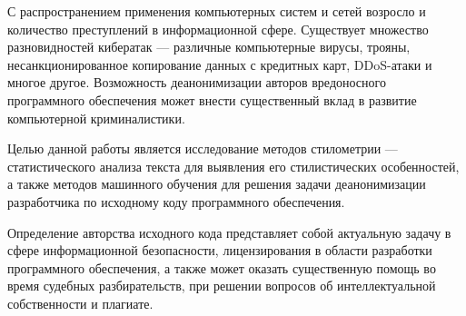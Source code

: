 С распространением применения компьютерных систем и сетей возросло и количество преступлений в 
информационной сфере. Существует множество разновидностей кибератак --- различные компьютерные вирусы, 
трояны, несанкционированное копирование данных с кредитных карт, DDoS-атаки и многое другое. 
Возможность деанонимизации авторов вредоносного программного обеспечения может внести существенный вклад 
в развитие компьютерной криминалистики.

Целью данной работы является исследование методов стилометрии --- статистического анализа текста 
для выявления его стилистических особенностей, а также методов машинного обучения для решения задачи 
деанонимизации разработчика по исходному коду программного обеспечения.

Определение авторства исходного кода представляет собой актуальную задачу в сфере информационной 
безопасности, лицензирования в области разработки программного обеспечения, а также может оказать 
существенную помощь во время судебных разбирательств, при решении вопросов об интеллектуальной 
собственности и плагиате.
